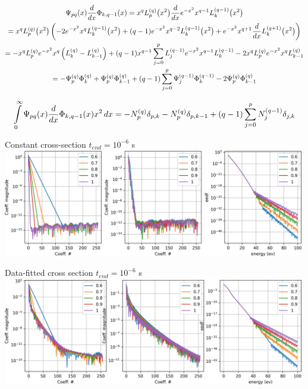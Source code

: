 \documentclass{article}[draft]
\begin{document}
\begin{multline*}
\Psi_{pq}\of{x} \frac{d}{dx}\Phi_{k, q-1}\of{x} 
= x^q \lp{q}{p}\of{x^2} \frac{d}{dx} e^{-x^2} x^{q-1} \lp{q-1}{k}\of{x^2}
\\
= x^q \lp{q}{p}\of{x^2} \left(
- 2 e^{-x^2} x^{q} L^{(q-1)}_k\of{x^2}
+ (q-1) e^{-x^2} x^{q-2} L^{(q-1)}_k\of{x^2}
+ e^{-x^2} x^{q+1} \frac{d}{dx} L^{(q+1)}_k\of{x^2}
\right)
\\
= - x^{q} \lp{q}{p} 
e^{-x^2} x^{q} \left( \lp{q}{k} - \lp{q}{k-1} \right)
+ (q-1) x^{q-1} \sum_{j=0}^{p} \lp{q-1}{j} e^{-x^2} x^{q-1} \lp{q-1}{k} 
- 2 x^q \lp{q}{p} e^{-x^2} x^q \lp{q}{k-1}
\\
= - \tfun{q}{p} \bfun{q}{k} 
+ \tfun{q}{p} \bfun{q}{k-1}
+ (q-1) \sum_{j=0}^{p} \tfun{q-1}{j} \bfun{q-1}{k} 
- 2 \tfun{q}{p} \bfun{q}{k-1}
\end{multline*}

\begin{multline*}
\myint_0^\infty \Psi_{pq}\of{x} \frac{d}{dx}\Phi_{k, q-1}\of{x} x^2 \diff{x}
= -  \nfun{q}{p} \delta_{p,k} 
- \nfun{q}{p} \delta_{p,k-1}
+ (q-1) \sum_{j=0}^{p} \nfun{q-1}{j} \delta_{j,k}
\end{multline*}

\newpage
Constant cross-section $t_{end} = 10^{-6}$ s\\
\includegraphics[width=0.99\textwidth]{fig/different_vth_const_1e-6.png}

Data-fitted cross section $t_{end} = 10^{-6}$ s\\
\includegraphics[width=0.99\textwidth]{fig/different_vth_real_1e-6.png}
\end{document}
